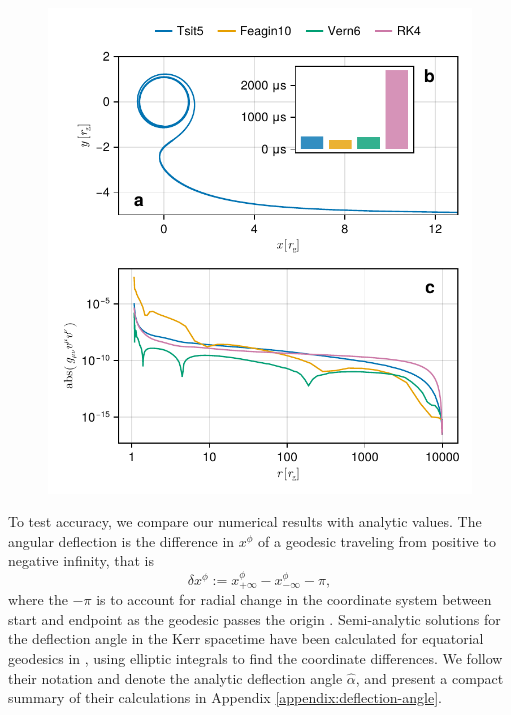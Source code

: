 \documentclass[fleqn,usenatbib]{mnras}
\begin{document}
\begin{figure}
	\centering
	\includegraphics[width=0.95\linewidth]{figures/stability.conservation.pdf}
	\caption{}
	\label{fig:dot-stability}
\end{figure}

To test accuracy, we compare our numerical results with analytic values. The angular deflection is the difference in $x^\phi$ of a geodesic traveling from positive to negative infinity, that is
\begin{equation}
	\delta x^\phi :=
		x^\phi_{+\infty} - x^\phi_{-\infty} 
		- \pi,
\end{equation}
where the $-\pi$ is to account for radial change in the coordinate system between start and endpoint as the geodesic passes the origin . Semi-analytic solutions for the deflection angle in the Kerr spacetime have been calculated for equatorial geodesics in \cite{iyer_lights_2009}, using elliptic integrals to find the coordinate differences. We follow their notation and denote the analytic deflection angle $\hat{\alpha}$, and present a compact summary of their calculations in Appendix \ref{appendix:deflection-angle}. 
\end{document}
